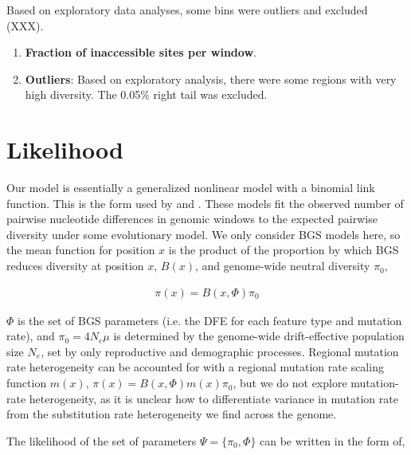 \documentclass[11pt]{article}
\begin{document}
Based on exploratory data analyses, some bins were outliers and
excluded (XXX). 



\begin{enumerate}
  \item \textbf{Fraction of inaccessible sites per window}.  

  \item \textbf{Outliers}: Based on exploratory analysis, there were some
    regions with very high diversity. The 0.05\% right tail was excluded.

\end{enumerate}



\section*{Likelihood}

Our model is essentially a generalized nonlinear model with a binomial link
function. This is the form used by \textcite{Elyashiv2016-vt} and
\textcite{Murphy2022-sj}. These models fit the observed number of pairwise
nucleotide differences in genomic windows to the expected pairwise diversity
under some evolutionary model. We only consider BGS models here, so the mean
function for position $x$ is the product of the proportion by which BGS reduces
diversity at position $x$, $B(x)$, and genome-wide neutral diversity $\pi_0$,

\begin{align}
  \pi(x) = B(x, \Phi) \pi_0
\end{align}

$\Phi$ is the set of BGS parameters (i.e. the DFE for each feature type and
mutation rate), and $\pi_0 = 4 N_e \mu$ is determined by the genome-wide
drift-effective population size $N_e$, set by only reproductive and demographic
processes. Regional mutation rate heterogeneity can be accounted for with a
regional mutation rate scaling function $m(x)$, $\pi(x) = B(x, \Phi) m(x)
\pi_0$, but we do not explore mutation-rate heterogeneity, as it is unclear how
to differentiate variance in mutation rate from the substitution rate
heterogeneity we find across the genome.

The likelihood of the set of parameters $\Psi = \{\pi_0, \Phi\}$ can be written
in the form of, 
\end{document}
